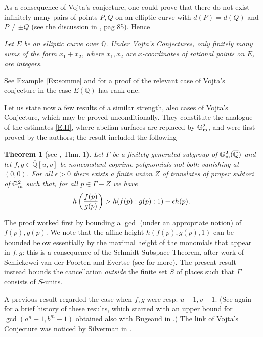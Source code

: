\documentclass[leqno,12pt]{article} %
\def\Q{{{\mathbb Q}}}
\def\G{{{\mathbb G}}}
\theoremstyle{plain} %
\newtheorem{theorem}{\indent\sc Theorem}[section]
\theoremstyle{definition} %
\begin{document}
As a consequence of Vojta's conjecture, one could prove that there do not exist infinitely many pairs of points $P,Q$ on an elliptic curve with $d(P)=d(Q)$ and $P\neq \pm Q$ (see the discussion in \cite{CZ-libro}, pag 85). 
Hence 
\smallskip
 
{\it Let $E$ be an elliptic curve over $\Q$. Under Vojta's Conjectures,  only finitely many sums of the form $x_1+x_2$, where $x_1,x_2$ are $x$-coordinates of rational points on $E$, are integers.}

 \smallskip

See Example \ref{Ex:somme} and \cite{McKinnon} for a proof of the relevant case of Vojta's conjecture in the case $E(\Q)$ has rank one. 
\medskip


Let us state now a few results of a similar strength, also cases of Vojta's Conjecture,  which may be proved unconditionally.  They constitute the analogue of the estimates \ref{E.H}, where abelian surfaces are replaced by $\G_{\rm m}^2$, and were first proved by the  authors; the  result included the following



\begin{theorem} [see \cite{CZgcd}, Thm. 1]\label{T.lower-bound-heights-1} Let $\Gamma$ be a finitely generated subgroup of $\G_{\rm m}^2(\overline\Q)$ and let $f,g\in \overline\Q[u,v]$ be nonconstant coprime polynomials not both vanishing at $(0,0)$.  For all $\epsilon >0$ there exists a finite union $Z$ of translates of proper subtori of $\G_{\rm m}^2$ such that, for all $p\in\Gamma -Z$ we have
$$
h\left({f(p)\over g(p)}\right) >h(f(p):g(p):1)-\epsilon h(p).
$$
\end{theorem}

The proof worked first by bounding a $\gcd$ (under an appropriate notion) of $f(p),g(p)$.   We note that the affine height  $h(f(p),g(p),1)$ can be bounded below essentially by the maximal height of the monomials that appear in $f,g$: this is a consequence of the Schmidt Subspace Theorem, after work of Schlickewei-van der Poorten and Evertse (see \cite{CZ-libro} for more). The present result instead bounds the cancellation {\it outside} the finite set $S$ of places such that $\Gamma$ consists of $S$-units.  

A previous result regarded the case when $f,g$ were resp. $u-1,v-1$. (See again \cite{CZ-libro} for a brief history of these results, which started with an upper bound for $\gcd(a^n-1,b^m-1)$ obtained also with  Bugeaud in \cite{BCZ}.)  The link of Vojta's Conjecture was noticed by  Silverman in \cite{Silverman}. 
\end{document}
